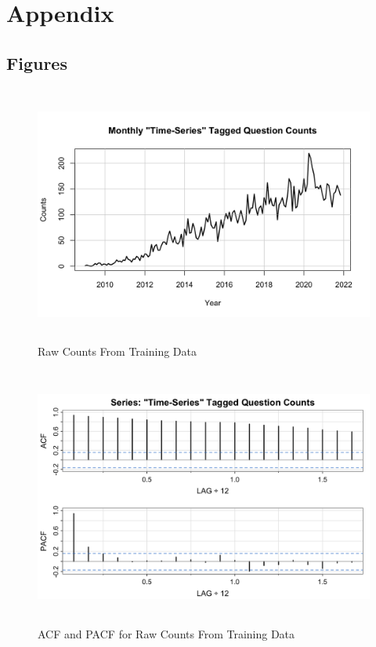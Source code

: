 \documentclass[10pt]{article}
\begin{document}
\newpage 

\printbibliography

\newpage

\section*{Appendix}

\subsection*{Figures}

\begin{figure}[ht!]
    \centering
    \includegraphics[height=85mm, width=115mm]{trn_raw_counts.png}
    \caption{Raw Counts From Training Data}
\end{figure}

\begin{figure}[ht!]
    \centering
    \includegraphics[height=85mm, width=115mm]{acf2_raw_counts.png}
    \caption{ACF and PACF for Raw Counts From Training Data}
\end{figure}
\end{document}
